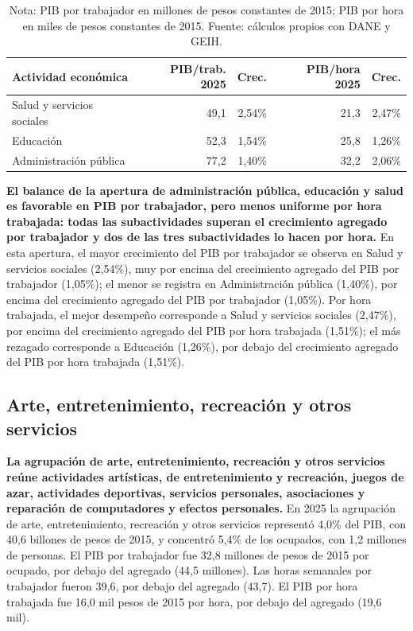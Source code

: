 \begin{table}[H]
\centering
\caption{Productividad laboral de las actividades de administración pública, educación y salud, 2010--2025}
\label{tab:sector_o_p_q_zoom25}
\small
\begin{tabular}{p{}rrrr}
\toprule
Actividad económica & PIB/trab. 2025 & Crec. & PIB/hora 2025 & Crec. \\
\midrule
Salud y servicios sociales & 49,1 & 2,54\% & 21,3 & 2,47\% \\
Educación & 52,3 & 1,54\% & 25,8 & 1,26\% \\
Administración pública & 77,2 & 1,40\% & 32,2 & 2,06\% \\
\bottomrule
\end{tabular}
\caption*{\footnotesize Nota: PIB por trabajador en millones de pesos constantes de 2015; PIB por hora en miles de pesos constantes de 2015. Fuente: cálculos propios con DANE y GEIH.}
\end{table}

\textbf{El balance de la apertura de administración pública, educación y salud es favorable en PIB por trabajador, pero menos uniforme por hora trabajada: todas las subactividades superan el crecimiento agregado por trabajador y dos de las tres subactividades lo hacen por hora.} En esta apertura, el mayor crecimiento del PIB por trabajador se observa en Salud y servicios sociales (2,54\%), muy por encima del crecimiento agregado del PIB por trabajador (1,05\%); el menor se registra en Administración pública (1,40\%), por encima del crecimiento agregado del PIB por trabajador (1,05\%). Por hora trabajada, el mejor desempeño corresponde a Salud y servicios sociales (2,47\%), por encima del crecimiento agregado del PIB por hora trabajada (1,51\%); el más rezagado corresponde a Educación (1,26\%), por debajo del crecimiento agregado del PIB por hora trabajada (1,51\%).

\subsection{Arte, entretenimiento, recreación y otros servicios}

\textbf{La agrupación de arte, entretenimiento, recreación y otros servicios reúne actividades artísticas, de entretenimiento y recreación, juegos de azar, actividades deportivas, servicios personales, asociaciones y reparación de computadores y efectos personales.} En 2025 la agrupación de arte, entretenimiento, recreación y otros servicios representó 4,0\% del PIB, con 40,6 billones de pesos de 2015, y concentró 5,4\% de los ocupados, con 1,2 millones de personas. El PIB por trabajador fue 32,8 millones de pesos de 2015 por ocupado, por debajo del agregado (44,5 millones). Las horas semanales por trabajador fueron 39,6, por debajo del agregado (43,7). El PIB por hora trabajada fue 16,0 mil pesos de 2015 por hora, por debajo del agregado (19,6 mil).

